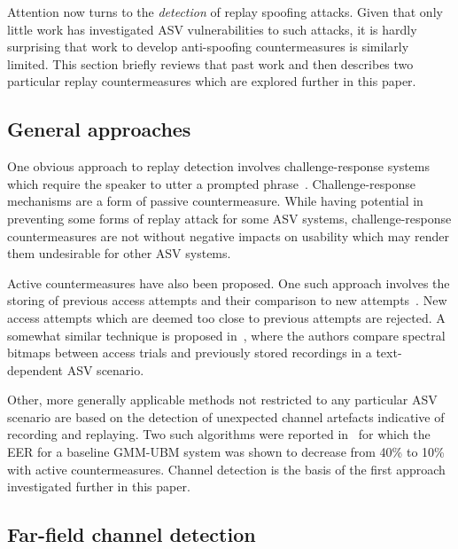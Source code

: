 
Attention now turns to the \emph{detection} of replay spoofing attacks.  Given that only little work has investigated ASV vulnerabilities to such attacks, it is hardly surprising that work to develop anti-spoofing countermeasures is similarly limited.  This section briefly reviews that past work and then describes two particular replay countermeasures which are explored further in this paper.



\subsection{General approaches}

One obvious approach to replay detection involves challenge-response systems which require the speaker to utter a prompted phrase~\cite{Petrovska1998}. 
Challenge-response mechanisms are a form of passive countermeasure.
While having potential in preventing some forms of replay attack for some ASV systems, challenge-response countermeasures are not without negative impacts on usability which may render them undesirable for other ASV systems.

Active countermeasures have also been proposed.
One such approach involves the storing of previous access attempts and their comparison to new attempts~\cite{Shang2010}.
New access attempts which are deemed too close to previous attempts are rejected.
A somewhat similar technique is proposed in~\cite{Wu2014}, where the authors compare spectral bitmaps between access trials and previously stored recordings in a text-dependent ASV scenario.

Other, more generally applicable methods not restricted to any particular ASV scenario are based on the detection of unexpected channel artefacts indicative of recording and replaying.
Two such algorithms were reported in~\cite{Wang2011} for which the EER for a baseline GMM-UBM system was shown to decrease from 40\% to 10\% with active countermeasures.  Channel detection is the basis of the first approach investigated further in this paper.



\subsection{Far-field channel detection}

